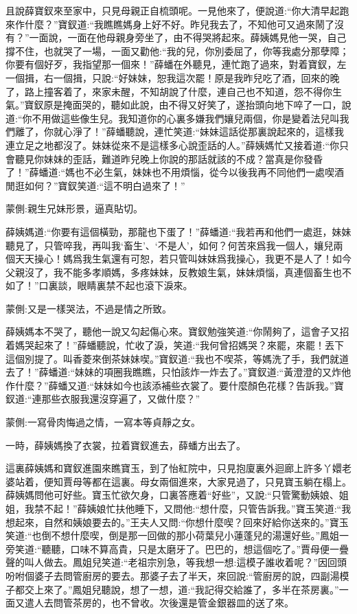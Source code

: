 \begin{parag}
    且說薛寶釵來至家中，只見母親正自梳頭呢。一見他來了，便說道:“你大清早起跑來作什麼？”寶釵道:“我瞧瞧媽身上好不好。昨兒我去了，不知他可又過來鬧了沒有？”一面說，一面在他母親身旁坐了，由不得哭將起來。薛姨媽見他一哭，自己撐不住，也就哭了一場，一面又勸他:“我的兒，你別委屈了，你等我處分那孽障；你要有個好歹，我指望那一個來！”薛蟠在外聽見，連忙跑了過來，對着寶釵，左一個揖，右一個揖，只說:“好妹妹，恕我這次罷！原是我昨兒吃了酒，回來的晚了，路上撞客着了，來家未醒，不知胡說了什麼，連自己也不知道，怨不得你生氣。”寶釵原是掩面哭的，聽如此說，由不得又好笑了，遂抬頭向地下啐了一口，說道:“你不用做這些像生兒。我知道你的心裏多嫌我們孃兒兩個，你是變着法兒叫我們離了，你就心淨了！”薛蟠聽說，連忙笑道:“妹妹這話從那裏說起來的，這樣我連立足之地都沒了。妹妹從來不是這樣多心說歪話的人。”薛姨媽忙又接着道:“你只會聽見你妹妹的歪話，難道昨兒晚上你說的那話就該的不成？當真是你發昏了！”薛蟠道:“媽也不必生氣，妹妹也不用煩惱，從今以後我再不同他們一處喫酒閒逛如何？”寶釵笑道:“這不明白過來了！”\begin{note}蒙側:親生兄妹形景，逼真貼切。\end{note}薛姨媽道:“你要有這個橫勁，那龍也下蛋了！”薛蟠道:“我若再和他們一處逛，妹妹聽見了，只管啐我，再叫我‘畜生’、‘不是人’，如何？何苦來爲我一個人，孃兒兩個天天操心！媽爲我生氣還有可恕，若只管叫妹妹爲我操心，我更不是人了！如今父親沒了，我不能多孝順媽，多疼妹妹，反教娘生氣，妹妹煩惱，真連個畜生也不如了！”口裏談，眼睛裏禁不起也滾下淚來。\begin{note}蒙側:又是一樣哭法，不過是情之所致。\end{note}薛姨媽本不哭了，聽他一說又勾起傷心來。寶釵勉強笑道:“你鬧夠了，這會子又招着媽哭起來了！”薛蟠聽說，忙收了淚，笑道:“我何曾招媽哭？來罷，來罷！丟下這個別提了。叫香菱來倒茶妹妹喫。”寶釵道:“我也不喫茶，等媽洗了手，我們就道去了！”薛蟠道:“妹妹的項圈我瞧瞧，只怕該炸一炸去了。”寶釵道:“黃澄澄的又炸他作什麼？”薛蟠又道:“妹妹如今也該添補些衣裳了。要什麼顏色花樣？告訴我。”寶釵道:“連那些衣服我還沒穿遍了，又做什麼？”\begin{note}蒙側:一寫骨肉悔過之情，一寫本等貞靜之女。\end{note}一時，薛姨媽換了衣裳，拉着寶釵進去，薛蟠方出去了。
\end{parag}


\begin{parag}
    這裏薛姨媽和寶釵進園來瞧寶玉，到了怡紅院中，只見抱廈裏外迴廊上許多丫嬛老婆站着，便知賈母等都在這裏。母女兩個進來，大家見過了，只見寶玉躺在榻上。薛姨媽問他可好些。寶玉忙欲欠身，口裏答應着“好些”，又說:“只管驚動姨娘、姐姐，我禁不起！”薛姨娘忙扶他睡下，又問他:“想什麼，只管告訴我。”寶玉笑道:“我想起來，自然和姨娘要去的。”王夫人又問:“你想什麼喫？回來好給你送來的。”寶玉笑道:“也倒不想什麼喫，倒是那一回做的那小荷葉兒小蓮蓬兒的湯還好些。”鳳姐一旁笑道:“聽聽，口味不算高貴，只是太磨牙了。巴巴的，想這個吃了。”賈母便一疊聲的叫人做去。鳳姐兒笑道:“老祖宗別急，等我想一想:這模子誰收着呢？”因回頭吩咐個婆子去問管廚房的要去。那婆子去了半天，來回說:“管廚房的說，四副湯模子都交上來了。”鳳姐兒聽說，想了一想，道:“我記得交給誰了，多半在茶房裏。”一面又遣人去問管茶房的，也不曾收。次後還是管金銀器皿的送了來。
\end{parag}


